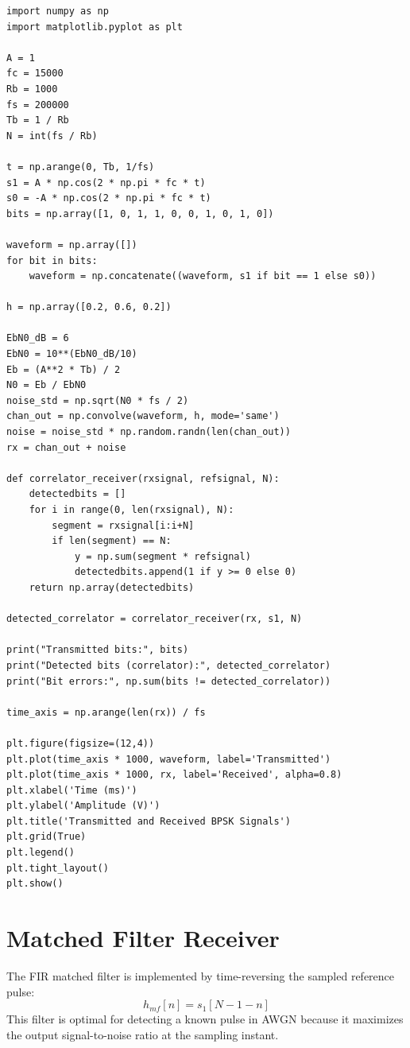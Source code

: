 \begin{lstlisting}[style=pythonstyle, caption={Channel Simulation and Correlator Receiver Implementation}]
import numpy as np
import matplotlib.pyplot as plt

A = 1
fc = 15000
Rb = 1000
fs = 200000
Tb = 1 / Rb
N = int(fs / Rb)

t = np.arange(0, Tb, 1/fs)
s1 = A * np.cos(2 * np.pi * fc * t)
s0 = -A * np.cos(2 * np.pi * fc * t)
bits = np.array([1, 0, 1, 1, 0, 0, 1, 0, 1, 0])

waveform = np.array([])
for bit in bits:
    waveform = np.concatenate((waveform, s1 if bit == 1 else s0))

h = np.array([0.2, 0.6, 0.2])

EbN0_dB = 6
EbN0 = 10**(EbN0_dB/10)
Eb = (A**2 * Tb) / 2
N0 = Eb / EbN0
noise_std = np.sqrt(N0 * fs / 2)
chan_out = np.convolve(waveform, h, mode='same')
noise = noise_std * np.random.randn(len(chan_out))
rx = chan_out + noise

def correlator_receiver(rxsignal, refsignal, N):
    detectedbits = []
    for i in range(0, len(rxsignal), N):
        segment = rxsignal[i:i+N]
        if len(segment) == N:
            y = np.sum(segment * refsignal)
            detectedbits.append(1 if y >= 0 else 0)
    return np.array(detectedbits)

detected_correlator = correlator_receiver(rx, s1, N)

print("Transmitted bits:", bits)
print("Detected bits (correlator):", detected_correlator)
print("Bit errors:", np.sum(bits != detected_correlator))

time_axis = np.arange(len(rx)) / fs

plt.figure(figsize=(12,4))
plt.plot(time_axis * 1000, waveform, label='Transmitted')
plt.plot(time_axis * 1000, rx, label='Received', alpha=0.8)
plt.xlabel('Time (ms)')
plt.ylabel('Amplitude (V)')
plt.title('Transmitted and Received BPSK Signals')
plt.grid(True)
plt.legend()
plt.tight_layout()
plt.show()
\end{lstlisting}

\section{Matched Filter Receiver}
The FIR matched filter is implemented by time-reversing the sampled reference pulse:
\[
h_{mf}[n]=s_1[N-1-n]
\]
This filter is optimal for detecting a known pulse in AWGN because it maximizes the output signal-to-noise ratio at the sampling instant.

